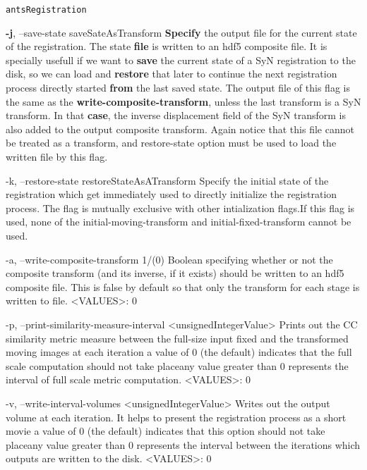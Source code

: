\documentclass[ignorenonframetext,]{beamer}
\newenvironment{Shaded}{\begin{snugshade}}{\end{snugshade}}
\newcommand{\KeywordTok}[1]{\textcolor[rgb]{0.13,0.29,0.53}{\textbf{{#1}}}}
\newcommand{\NormalTok}[1]{{#1}}
\begin{document}
\begin{frame}[fragile]{\texttt{antsRegistration}}
\begin{Shaded}
\begin{Highlighting}[]
     \KeywordTok{-j}\NormalTok{, --save-state saveSateAsTransform}
          \KeywordTok{Specify} \NormalTok{the output file for the current state of the registration. The state}
          \KeywordTok{file} \NormalTok{is written to an hdf5 composite file. It is specially usefull if we want to}
          \KeywordTok{save} \NormalTok{the current state of a SyN registration to the disk, so we can load and}
          \KeywordTok{restore} \NormalTok{that later to continue the next registration process directly started}
          \KeywordTok{from} \NormalTok{the last saved state. The output file of this flag is the same as the}
          \KeywordTok{write-composite-transform}\NormalTok{, unless the last transform is a SyN transform. In that}
          \KeywordTok{case}\NormalTok{, the inverse displacement field of the SyN transform is also added to the}
          \NormalTok{output composite transform. Again notice that this file cannot be treated as a}
          \NormalTok{transform, and restore-state option must be used to load the written file by}
          \NormalTok{this flag.}

     \NormalTok{-k, --restore-state restoreStateAsATransform}
          \NormalTok{Specify the initial state of the registration which get immediately used to}
          \NormalTok{directly initialize the registration process. The flag is mutually exclusive}
          \NormalTok{with other intialization flags.If this flag is used, none of the}
          \NormalTok{initial-moving-transform and initial-fixed-transform cannot be used.}

     \NormalTok{-a, --write-composite-transform 1/(0)}
          \NormalTok{Boolean specifying whether or not the composite transform (and its inverse, if}
          \NormalTok{it exists) should be written to an hdf5 composite file. This is false by default}
          \NormalTok{so that only the transform for each stage is written to file.}
          \NormalTok{<VALUES>: 0}

     \NormalTok{-p, --print-similarity-measure-interval <unsignedIntegerValue>}
          \NormalTok{Prints out the CC similarity metric measure between the full-size input fixed}
          \NormalTok{and the transformed moving images at each iteration a value of 0 (the default)}
          \NormalTok{indicates that the full scale computation should not take placeany value greater}
          \NormalTok{than 0 represents the interval of full scale metric computation.}
          \NormalTok{<VALUES>: 0}

     \NormalTok{-v, --write-interval-volumes <unsignedIntegerValue>}
          \NormalTok{Writes out the output volume at each iteration. It helps to present the}
          \NormalTok{registration process as a short movie a value of 0 (the default) indicates that}
          \NormalTok{this option should not take placeany value greater than 0 represents the}
          \NormalTok{interval between the iterations which outputs are written to the disk.}
          \NormalTok{<VALUES>: 0}


\end{Highlighting}
\end{Shaded}
\end{frame}
\end{document}
